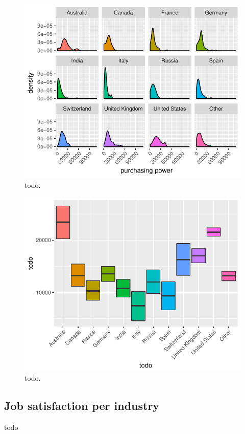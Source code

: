 \documentclass{article}
\begin{document}
\begin{figure}[H]
\centering
\includegraphics{report-021}
\caption{todo.}\label{fig_5}
\end{figure}




\begin{figure}[H]
\centering
\includegraphics{report-025}
\caption{todo.}\label{fig_6}
\end{figure}

\subsection{Job satisfaction per industry}
todo
\end{document}
